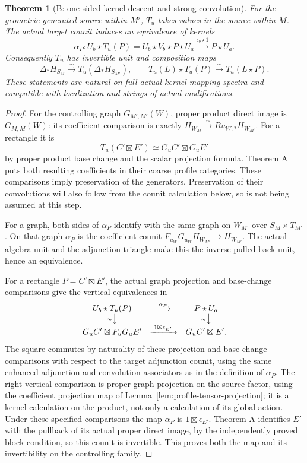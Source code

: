 \documentclass[11pt]{article}
\newtheorem{theorem}{Theorem}[section]
\theoremstyle{definition}
\theoremstyle{remark}
\begin{document}
\begin{theorem}[B: one-sided kernel descent and strong convolution]
\label{thm:profile-kernel-descent}
For the geometric generated source within $M'$, $T_u$ takes values
in the source within $M$.  The actual target counit induces an
equivalence of kernels
\[
 \alpha_P:U_b\star T_u(P)
       =U_b\star V_b\star P\star U_a
       \xrightarrow{\epsilon_b\star1}P\star U_a.
\]
Consequently $T_u$ has invertible unit and composition maps
\[
 \Delta_*H_{S_M}\xrightarrow{\sim}T_u(\Delta_*H_{S_{M'}}),
 \qquad T_u(L)\star T_u(P)\xrightarrow{\sim}T_u(L\star P).
\]
These statements are natural on full actual kernel mapping spectra
and compatible with localization and strings of actual modifications.
\end{theorem}
\begin{proof}
For the controlling graph $G_{M',M'}(W)$, proper product direct
image is $G_{M,M}(W)$: its coefficient comparison is exactly
$H_{W_M}\xrightarrow{\sim}Ru_{W,*}H_{W_{M'}}$.
For a rectangle it is
\[
 T_u(C'\boxtimes E')\simeq G_uC'\boxtimes G_uE'
\]
by proper product base change and the scalar projection formula.
Theorem A puts both resulting coefficients in their coarse profile
categories.  These comparisons imply preservation of the generators.
Preservation of their convolutions will also follow from the counit
calculation below, so is not being assumed at this step.

For a graph, both sides of $\alpha_P$ identify with the same graph
on $W_{M'}$ over $S_M\times T_{M'}$.  On that graph $\alpha_P$ is
the coefficient counit $F_{u_W}G_{u_W}H_{W_{M'}}\to H_{W_{M'}}$.
The actual algebra unit and the adjunction triangle make this the
inverse pulled-back unit, hence an equivalence.

For a rectangle $P=C'\boxtimes E'$, the actual graph projection
and base-change comparisons give the vertical equivalences in
\[
\begin{array}{ccc}
 U_b\star T_u(P) & \xrightarrow{\alpha_P} & P\star U_a\\
 {\scriptstyle\sim}\big\downarrow &&
 {\scriptstyle\sim}\big\downarrow\\
 G_uC'\boxtimes F_uG_uE' &
 \xrightarrow{\;1\boxtimes\epsilon_{E'}\;} & G_uC'\boxtimes E'.
\end{array}
\]
The square commutes by naturality of these projection and base-change
comparisons with respect to the target adjunction counit, using the
same enhanced adjunction and convolution associators as in the
definition of $\alpha_P$.
The right vertical comparison is proper graph projection on the source
factor, using the coefficient projection map of
Lemma~\ref{lem:profile-tensor-projection}; it is a kernel calculation
on the product, not only a calculation of its global action.
Under these specified comparisons the map $\alpha_P$ is
$1\boxtimes\epsilon_{E'}$.  Theorem A identifies $E'$ with the
pullback of its actual proper direct image, by the independently
proved block condition, so this counit is invertible.  This proves
both the map and its invertibility on the controlling family.


\end{proof}
\end{document}
